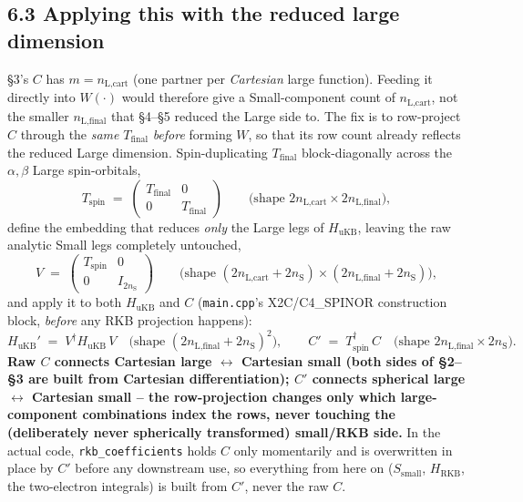 \documentclass[11pt]{article}
\begin{document}
\subsection*{6.3 Applying this with the reduced large dimension}

\S3's $C$ has $m=n_{\text{L,cart}}$ (one partner per \emph{Cartesian} large function). Feeding it
directly into $W(\cdot)$ would therefore give a Small-component count of $n_{\text{L,cart}}$, not
the smaller $n_{\text{L,final}}$ that \S4--\S5 reduced the Large side to. The fix is to row-project
$C$ through the \emph{same} $T_{\text{final}}$ \emph{before} forming $W$, so that its row count
already reflects the reduced Large dimension. Spin-duplicating $T_{\text{final}}$ block-diagonally
across the $\alpha,\beta$ Large spin-orbitals,
\begin{equation}
T_{\text{spin}} \;=\; \begin{pmatrix} T_{\text{final}} & 0 \\ 0 & T_{\text{final}} \end{pmatrix}
\qquad\big(\text{shape } 2n_{\text{L,cart}}\times2n_{\text{L,final}}\big),
\end{equation}
define the embedding that reduces \emph{only} the Large legs of $H_{\text{uKB}}$, leaving the raw
analytic Small legs completely untouched,
\begin{equation}
V \;=\; \begin{pmatrix} T_{\text{spin}} & 0 \\ 0 & I_{2n_{\text{S}}} \end{pmatrix}
\qquad\big(\text{shape } (2n_{\text{L,cart}}+2n_{\text{S}})\times(2n_{\text{L,final}}+2n_{\text{S}})\big),
\end{equation}
and apply it to both $H_{\text{uKB}}$ and $C$ (\texttt{main.cpp}'s X2C/C4\_SPINOR construction
block, \emph{before} any RKB projection happens):
\begin{equation}
H_{\text{uKB}}' \;=\; V^{\dagger} H_{\text{uKB}}\, V
\quad\big(\text{shape } (2n_{\text{L,final}}+2n_{\text{S}})^2\big),
\qquad
C' \;=\; T_{\text{spin}}^{\dagger}\, C
\quad\big(\text{shape } 2n_{\text{L,final}}\times2n_{\text{S}}\big).
\end{equation}
\textbf{Raw $C$ connects Cartesian large $\leftrightarrow$ Cartesian small (both sides of \S2--\S3
are built from Cartesian differentiation); $C'$ connects spherical large $\leftrightarrow$ Cartesian
small -- the row-projection changes only which large-component combinations index the rows, never
touching the (deliberately never spherically transformed) small/RKB side.} In the actual code,
\texttt{rkb\_coefficients} holds $C$ only momentarily and is overwritten in place by $C'$ before any
downstream use, so everything from here on ($S_{\text{small}}$, $H_{\text{RKB}}$, the two-electron
integrals) is built from $C'$, never the raw $C$.
\end{document}
